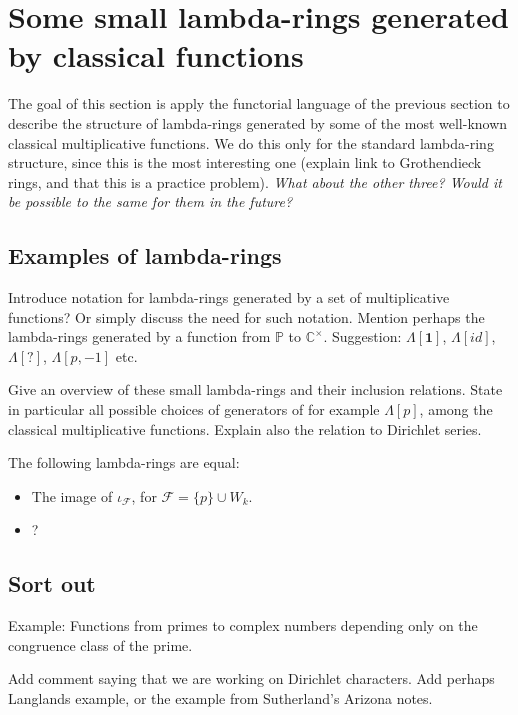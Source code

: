 
\section{Some small lambda-rings generated by classical functions}

The goal of this section is apply the functorial language of the previous section to describe the structure of lambda-rings generated by some of the most well-known classical multiplicative functions. We do this only for the standard lambda-ring structure, since this is the most interesting one (explain link to Grothendieck rings, and that this is a practice problem). \emph{What about the other three? Would it be possible to the same for them in the future?}


\subsection{Examples of lambda-rings}

Introduce notation for lambda-rings generated by a set of multiplicative functions? Or simply discuss the need for such notation. Mention perhaps the lambda-rings generated by a function from $\mathbb{P}$ to $\mathbb{C}^{\times}$. Suggestion: $\Lambda[\mathbf{1}]$, $\Lambda[id]$, $\Lambda[?]$, $\Lambda[p, -1]$ etc. 

Give an overview of these small lambda-rings and their inclusion relations. State in particular all possible choices of generators of for example $\Lambda[p]$, among the classical multiplicative functions. Explain also the relation to Dirichlet series.

\begin{proposition}
The following lambda-rings are equal:
\begin{itemize}
\item The image of $\iota_{\mathcal{F}}$, for $\mathcal{F} = \{ p \} \cup W_k$. 
\item ?
\end{itemize}

\end{proposition}



\subsection{Sort out}

Example: Functions from primes to complex numbers depending only on the congruence class of the prime.

Add comment saying that we are working on Dirichlet characters. Add perhaps Langlands example, or the example from Sutherland's Arizona notes.


